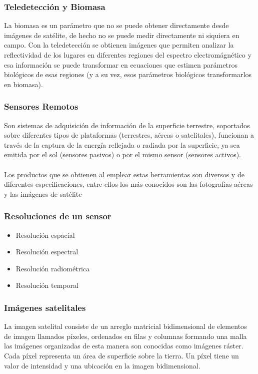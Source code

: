 \documentclass[xcolor=table]{beamer}
\begin{document}
\begin{frame}\frametitle{Teledetecci\'on y Biomasa }
	
	La biomasa es un par\'ametro que no se puede obtener directamente desde im\'agenes de sat\'elite, de hecho no se puede medir directamente ni siquiera en campo. Con la teledetecci\'on se obtienen im\'agenes que permiten analizar la reflectividad de los lugares en diferentes regiones del espectro electrom\'agnético y esa informaci\'on se puede transformar en ecuaciones que estimen par\'ametros biol\'ogicos de esas regiones (y a su vez, esos par\'ametros biol\'ogicos transformarlos en biomasa).
	
	
\end{frame}



\begin{frame}\frametitle{Sensores Remotos}
Son sistemas de adquisici\'on de informaci\'on de la superficie terrestre, soportados sobre diferentes tipos de plataformas (terrestres, a\'ereas o satelitales), funcionan a trav\'es de la captura de la energ\'ia reflejada o radiada por la superficie, ya
sea emitida por el sol (sensores pasivos) o por el mismo sensor (sensores activos). \\~\\
Los productos que se obtienen al emplear estas herramientas son diversos y de diferentes especificaciones, entre ellos los m\'as conocidos son las fotografías aéreas y las im\'agenes de sat\'elite
	
\end{frame}

\begin{frame}\frametitle{Resoluciones de un sensor}

	\begin{itemize}
		\item Resoluci\'on espacial
		\item Resoluci\'on espectral
		\item Resoluci\'on radiom\'etrica
		\item Resoluci\'on temporal
	\end{itemize}
	
	
\end{frame}

\begin{frame}\frametitle{Im\'agenes satelitales}
	La imagen satelital consiste de un arreglo matricial bidimensional de elementos de imagen llamados p\'ixeles, ordenados en filas y columnas formando una malla las im\'agenes organizadas de esta manera son conocidas como im\'agenes r\'aster. Cada p\'ixel representa un \'area de superficie sobre la tierra. Un p\'ixel tiene un valor de intensidad y una ubicaci\'on en la imagen bidimensional.
	
\end{frame}
\end{document}
